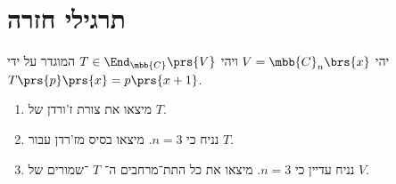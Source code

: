 \documentclass[a4paper,10pt,twoside,openany]{book}
\begin{document}
\chapter{תרגילי חזרה}

\begin{exercisechap}
יהי
$V = \mbb{C}_n\brs{x}$
ויהי
$T \in \End_{\mbb{C}}\prs{V}$
המוגדר על ידי
$T\prs{p}\prs{x} = p\prs{x+1}$.

\begin{enumerate}
\item מיצאו את צורת ז'ורדן של
$T$.
\item
נניח כי
$n = 3$.
מיצאו בסיס מז'רדן עבור
$T$.
\item
נניח עדיין כי
$n = 3$.
מיצאו את כל התת־מרחבים ה־%
$T$%
־שמורים של
$V$.
\end{enumerate}
\end{exercisechap}
\end{document}
